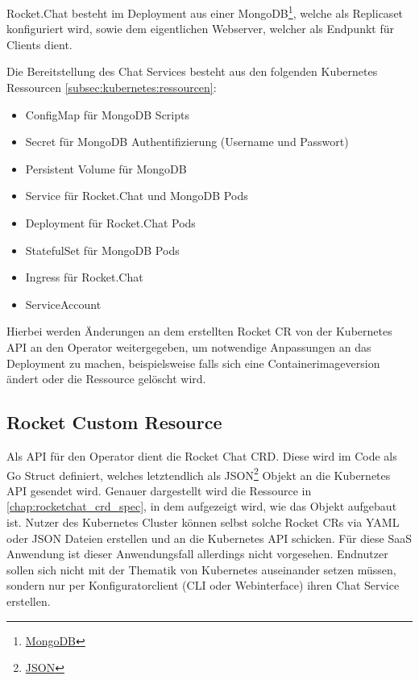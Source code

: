 Rocket.Chat besteht im Deployment aus einer MongoDB\footnote{\href{https://www.mongodb.com/}{MongoDB}}, welche als Replicaset konfiguriert wird,
sowie dem eigentlichen Webserver, welcher als Endpunkt für Clients dient.

Die Bereitstellung des Chat Services besteht aus den folgenden Kubernetes Ressourcen \ref{subsec:kubernetes:ressourcen}:
\begin{itemize}
  \item ConfigMap für MongoDB Scripts
  \item Secret für MongoDB Authentifizierung (Username und Passwort)
  \item Persistent Volume für MongoDB
  \item Service für Rocket.Chat und MongoDB Pods
  \item Deployment für Rocket.Chat Pods
  \item StatefulSet für MongoDB Pods
  \item Ingress für Rocket.Chat
  \item ServiceAccount
\end{itemize} 

Hierbei werden Änderungen an dem erstellten Rocket \ac{CR} von der Kubernetes API an den Operator weitergegeben, um
notwendige Anpassungen an das Deployment zu machen, beispielsweise falls sich eine Containerimageversion ändert 
oder die Ressource gelöscht wird. 

\subsection{Rocket Custom Resource}
Als API für den Operator dient die Rocket Chat \ac{CRD}. Diese wird im Code als Go Struct definiert, welches letztendlich
als JSON\footnote{\href{https://www.json.org/json-de.html}{JSON}} Objekt an die Kubernetes API gesendet wird.
Genauer dargestellt wird die Ressource in \ref{chap:rocketchat_crd_spec}, in dem aufgezeigt wird, wie das Objekt aufgebaut ist.
Nutzer des Kubernetes Cluster können selbst solche Rocket \acp{CR} via YAML oder JSON Dateien erstellen und
an die Kubernetes API schicken. Für diese \ac{SaaS} Anwendung ist dieser Anwendungsfall allerdings nicht vorgesehen.
Endnutzer sollen sich nicht mit der Thematik von Kubernetes auseinander setzen müssen, 
sondern nur per Konfiguratorclient (\ac{CLI} oder Webinterface) ihren Chat Service erstellen.


